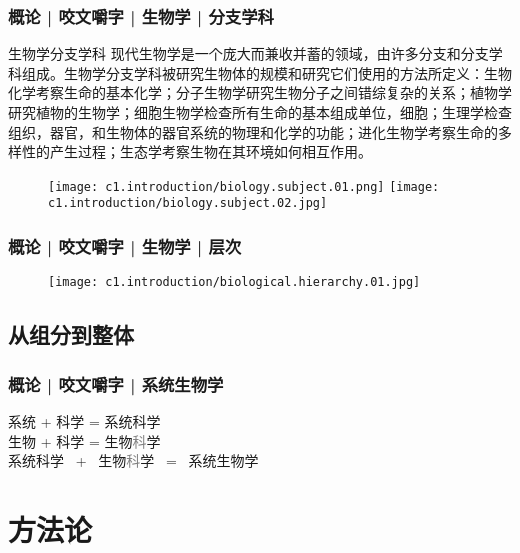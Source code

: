 \begin{frame}
  \frametitle{概论 | 咬文嚼字 | 生物学 | 分支学科}
  \begin{block}{生物学分支学科}
现代生物学是一个庞大而兼收并蓄的领域，由许多分支和分支学科组成。生物学分支学科被研究生物体的规模和研究它们使用的方法所定义：生物化学考察生命的基本化学；分子生物学研究生物分子之间错综复杂的关系；植物学研究植物的生物学；细胞生物学检查所有生命的基本组成单位，细胞；生理学检查组织，器官，和生物体的器官系统的物理和化学的功能；进化生物学考察生命的多样性的产生过程；生态学考察生物在其环境如何相互作用。
  \end{block}
  \begin{figure}
    \centering
    \texttt{[image: c1.introduction/biology.subject.01.png]}\qquad
    \texttt{[image: c1.introduction/biology.subject.02.jpg]}
  \end{figure}
\end{frame}

\begin{frame}
  \frametitle{概论 | 咬文嚼字 | 生物学 | 层次}
  \begin{figure}
    \centering
    \texttt{[image: c1.introduction/biological.hierarchy.01.jpg]}
  \end{figure}
\end{frame}

\subsection{从组分到整体}
\begin{frame}
  \frametitle{概论 | 咬文嚼字 | 系统生物学}
  \begin{huge}
  \begin{center}
    \pause
    系统 \quad + \quad 科学 \quad = \quad 系统科学\\  
    \vspace{1em}
    \pause
    生物 \quad + \quad 科学 \quad = \quad 生物\textcolor{gray}{科}学\\ 
    \vspace{1em}
    \pause
    系统科学 \ + \ 生物\textcolor{gray}{科}学 \ = \ 系统生物学
  \end{center}
  \end{huge}
\end{frame}

\section{方法论}
